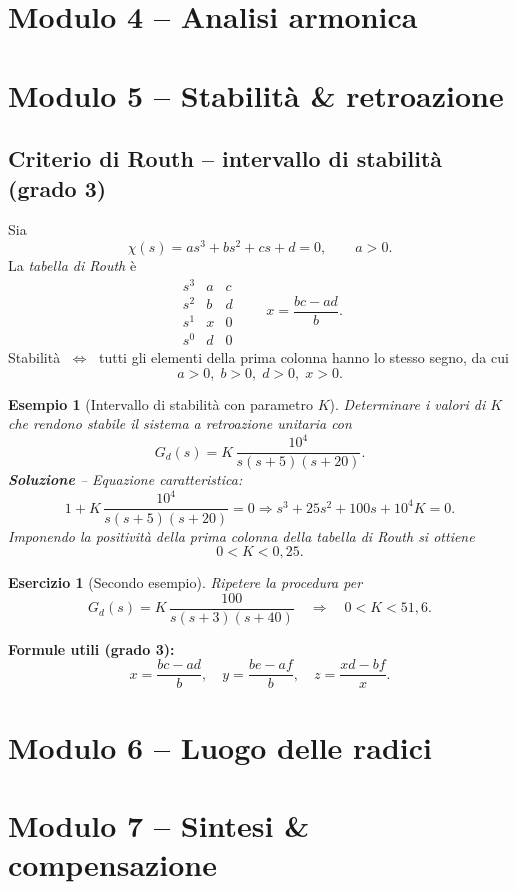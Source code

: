 \documentclass[a4paper,11pt]{article}
\newtheorem{exercise}{Esercizio}[section]
\newtheorem{example}{Esempio}[section]
\begin{document}
\section{Modulo 4 – Analisi armonica}

\section{Modulo 5 – Stabilità \& retroazione}

\subsection*{Criterio di Routh – intervallo di stabilità (grado 3)}
Sia
\[
\chi(s)=a s^{3}+b s^{2}+c s + d = 0 ,\qquad a>0 .
\]
La \emph{tabella di Routh} è
\[
\begin{array}{c|cc}
s^{3} & a & c \\
s^{2} & b & d \\
s^{1} & x & 0 \\
s^{0} & d & 0
\end{array}
\qquad
x=\frac{b c - a d}{b}.
\]
Stabilità $\;\Longleftrightarrow\;$ tutti gli elementi della prima colonna hanno lo stesso segno, da cui
\[
a>0,\; b>0,\; d>0,\; x>0.
\]

\begin{example}[Intervallo di stabilità con parametro $K$]
Determinare i valori di $K$ che rendono stabile il sistema a retroazione unitaria con
\[
G_d(s)=K\,\frac{10^{4}}{s(s+5)(s+20)}.
\]
\textbf{Soluzione} – Equazione caratteristica:
\[
1+K\,\frac{10^{4}}{s(s+5)(s+20)}=0
\Longrightarrow
s^{3}+25 s^{2}+100 s + 10^{4} K = 0.
\]
Imponendo la positività della prima colonna della tabella di Routh si ottiene
\[
0 < K < 0{,}25.
\]
\end{example}

\begin{exercise}[Secondo esempio]
Ripetere la procedura per
\[
G_d(s)=K\,\frac{100}{s(s+3)(s+40)}\quad\Rightarrow\quad 0<K<51{,}6.
\]
\end{exercise}

\bigskip
\noindent\textbf{Formule utili (grado 3):}
\[
x=\frac{b c - a d}{b},\quad
y=\frac{b e - a f}{b},\quad
z=\frac{x d - b f}{x}.
\]

\section{Modulo 6 – Luogo delle radici}

\section{Modulo 7 – Sintesi \& compensazione}
\end{document}
